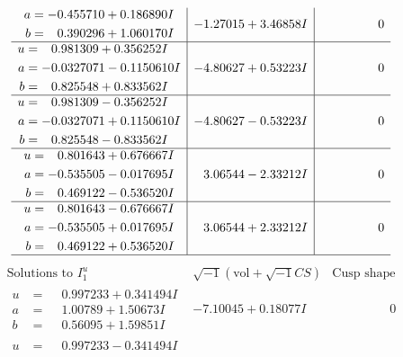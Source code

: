 \documentclass[1p]{elsarticle_modified}
\theoremstyle{definition}
\newcommand{\I}{\sqrt{-1}}
\begin{document}
$$\begin{array}{c|c|c}
\begin{aligned}
a &= -0.455710 + 0.186890 I \\
b &= \phantom{-}0.390296 + 1.060170 I\end{aligned}
 & -1.27015 + 3.46858 I & \phantom{-0.000000 } 0 \\ \hline\begin{aligned}
u &= \phantom{-}0.981309 + 0.356252 I \\
a &= -0.0327071 - 0.1150610 I \\
b &= \phantom{-}0.825548 + 0.833562 I\end{aligned}
 & -4.80627 + 0.53223 I & \phantom{-0.000000 } 0 \\ \hline\begin{aligned}
u &= \phantom{-}0.981309 - 0.356252 I \\
a &= -0.0327071 + 0.1150610 I \\
b &= \phantom{-}0.825548 - 0.833562 I\end{aligned}
 & -4.80627 - 0.53223 I & \phantom{-0.000000 } 0 \\ \hline\begin{aligned}
u &= \phantom{-}0.801643 + 0.676667 I \\
a &= -0.535505 - 0.017695 I \\
b &= \phantom{-}0.469122 - 0.536520 I\end{aligned}
 & \phantom{-}3.06544 - 2.33212 I & \phantom{-0.000000 } 0 \\ \hline\begin{aligned}
u &= \phantom{-}0.801643 - 0.676667 I \\
a &= -0.535505 + 0.017695 I \\
b &= \phantom{-}0.469122 + 0.536520 I\end{aligned}
 & \phantom{-}3.06544 + 2.33212 I & \phantom{-0.000000 } 0\\
 \hline 
 \end{array}$$\newpage$$\begin{array}{c|c|c}  
\text{Solutions to }I^u_{1}& \I (\text{vol} + \sqrt{-1}CS) & \text{Cusp shape}\\
 \hline 
\begin{aligned}
u &= \phantom{-}0.997233 + 0.341494 I \\
a &= \phantom{-}1.00789 + 1.50673 I \\
b &= \phantom{-}0.56095 + 1.59851 I\end{aligned}
 & -7.10045 + 0.18077 I & \phantom{-0.000000 } 0 \\ \hline\begin{aligned}
u &= \phantom{-}0.997233 - 0.341494 I \\

\end{aligned}
\end{array}$$
\end{document}
